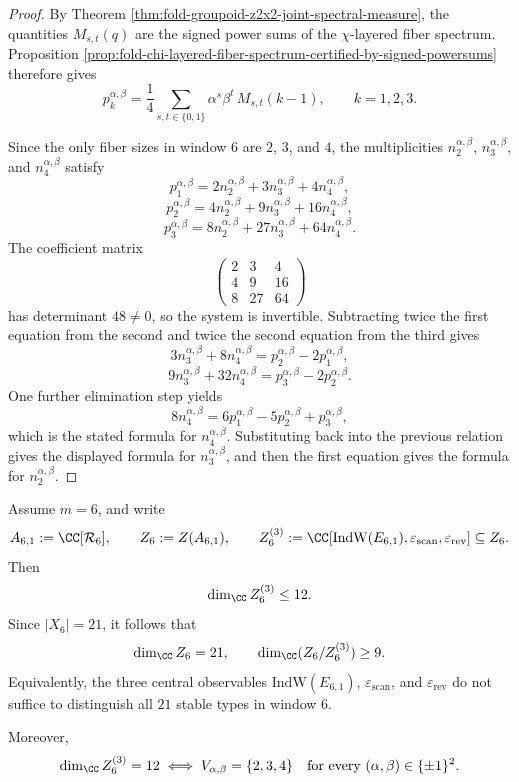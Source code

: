 \begin{proof}
By Theorem \ref{thm:fold-groupoid-z2x2-joint-spectral-measure}, the quantities \(M_{s,t}(q)\) are the signed power sums of the \(\chi\)-layered fiber spectrum. Proposition \ref{prop:fold-chi-layered-fiber-spectrum-certified-by-signed-powersums} therefore gives
\[
p_k^{\alpha,\beta}
=
\frac14\sum_{s,t\in\{0,1\}}\alpha^s\beta^t\,M_{s,t}(k-1),
\qquad k=1,2,3.
\]

Since the only fiber sizes in window \(6\) are \(2\), \(3\), and \(4\), the multiplicities \(n_2^{\alpha,\beta}\), \(n_3^{\alpha,\beta}\), and \(n_4^{\alpha,\beta}\) satisfy
\[
p_1^{\alpha,\beta}=2n_2^{\alpha,\beta}+3n_3^{\alpha,\beta}+4n_4^{\alpha,\beta},
\]
\[
p_2^{\alpha,\beta}=4n_2^{\alpha,\beta}+9n_3^{\alpha,\beta}+16n_4^{\alpha,\beta},
\]
\[
p_3^{\alpha,\beta}=8n_2^{\alpha,\beta}+27n_3^{\alpha,\beta}+64n_4^{\alpha,\beta}.
\]
The coefficient matrix
\[
\begin{pmatrix}
2&3&4\\
4&9&16\\
8&27&64
\end{pmatrix}
\]
has determinant \(48\neq 0\), so the system is invertible. Subtracting twice the first equation from the second and twice the second equation from the third gives
\[
3n_3^{\alpha,\beta}+8n_4^{\alpha,\beta}=p_2^{\alpha,\beta}-2p_1^{\alpha,\beta},
\]
\[
9n_3^{\alpha,\beta}+32n_4^{\alpha,\beta}=p_3^{\alpha,\beta}-2p_2^{\alpha,\beta}.
\]
One further elimination step yields
\[
8n_4^{\alpha,\beta}=6p_1^{\alpha,\beta}-5p_2^{\alpha,\beta}+p_3^{\alpha,\beta},
\]
which is the stated formula for \(n_4^{\alpha,\beta}\). Substituting back into the previous relation gives the displayed formula for \(n_3^{\alpha,\beta}\), and then the first equation gives the formula for \(n_2^{\alpha,\beta}\).
\end{proof}

\begin{theorem}\label{thm:fold-window6-center-three-observables-dimension-defect}
Assume \(m=6\), and write
\[
A_{6,1}:=\CC[\mathcal R_6],
\qquad
Z_6:=Z(A_{6,1}),
\qquad
Z_6^{(3)}:=\CC\!\left[\mathrm{IndW}(E_{6,1}),\varepsilon_{\mathrm{scan}},\varepsilon_{\mathrm{rev}}\right]\subseteq Z_6.
\]
Then
\[
\dim_{\CC}Z_6^{(3)}\le 12.
\]
Since \(|X_6|=21\), it follows that
\[
\dim_{\CC}Z_6=21,
\qquad
\dim_{\CC}(Z_6/Z_6^{(3)})\ge 9.
\]
Equivalently, the three central observables \(\mathrm{IndW}(E_{6,1})\), \(\varepsilon_{\mathrm{scan}}\), and \(\varepsilon_{\mathrm{rev}}\) do not suffice to distinguish all \(21\) stable types in window \(6\).

Moreover,
\[
\dim_{\CC}Z_6^{(3)}=12
\iff
V_{\alpha,\beta}=\{2,3,4\}
\quad\text{for every }(\alpha,\beta)\in\{\pm1\}^2.
\]
\end{theorem}

